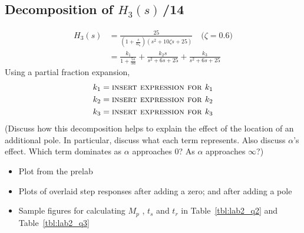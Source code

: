 \documentclass{article}
\newcommand{\score}{\hfill \underline{\hspace{0.65cm}}\,/} %
\begin{document}
\subsection{Decomposition of $H_3(s)$\score 14}
\begin{align*}
H_3(s) &= \frac{25}{\left(1+\frac{s}{\alpha \zeta}\right)\left( s^2 + 10 \zeta s + 25\right) } \mbox{~~~($\zeta = 0.6$)} \\
&= \frac{k_1}{1+\frac{5s}{3\alpha}} + \frac{k_2 s}{s^2+6s+25} + \frac{k_3}{s^2+6s+25}
\end{align*}
Using a partial fraction expansion,
\begin{align*}
k_1 &= \mbox{\sc insert expression for $k_1$}\\
k_2 &= \mbox{\sc insert expression for $k_2$}\\
k_3 &= \mbox{\sc insert expression for $k_3$}
\end{align*}
(Discuss how this decomposition helps to explain the effect of the location of an additional pole. In particular, discuss what each term represents. Also discuss $\alpha$'s effect. Which term dominates as $\alpha$ approaches 0? As $\alpha$ approaches $\infty$?)
\newline \\[10mm]
\begin{itemize}
\item Plot from the prelab
\item Plots of overlaid step responses after adding a zero; and after adding a pole
\item Sample figures for calculating $M_p$ , $t_s$ and $t_r$ in Table~\ref{tbl:lab2_q2} and Table~\ref{tbl:lab2_q3}
\end{itemize}
\end{document}
